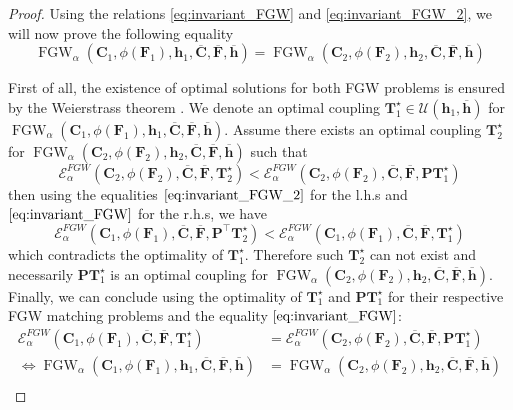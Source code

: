 \documentclass{article}
\def\vh{{\bm{h}}}
\def\mC{{\bm{C}}}
\def\mF{{\bm{F}}}
\def\mP{{\bm{P}}}
\def\mT{{\bm{T}}}
\newcommand{\FGW}{\operatorname{FGW}}
\begin{document}
{\begin{proof}
Using the relations \ref{eq:invariant_FGW} and \ref{eq:invariant_FGW_2}, we will now prove the following equality 
\begin{equation}
	\FGW_\alpha(\mC_1, \phi(\mF_1), \vh_1,  \overline{\mC}, \overline{\mF}, \overline{\vh}) = \FGW_\alpha(\mC_2, \phi(\mF_2), \vh_2,  \overline{\mC}, \overline{\mF}, \overline{\vh})
\end{equation}



First of all, the existence of optimal solutions for both FGW problems is ensured by the Weierstrass theorem \cite{santambrogio2015optimal}. We denote an optimal coupling $\mT^\star_1 \in \mathcal{U}(\vh_1, \overline{\vh})$ for $\FGW_\alpha(\mC_1, \phi(\mF_1), \vh_1,  \overline{\mC}, \overline{\mF}, \overline{\vh})$. Assume there exists an optimal coupling $\mT^\star_2$ for $\FGW_\alpha(\mC_2, \phi(\mF_2), \vh_2,  \overline{\mC}, \overline{\mF}, \overline{\vh})$ such that 
\begin{equation}
	\mathcal{E}^{FGW}_\alpha(\mC_2, \phi(\mF_2), \overline{\mC}, \overline{\mF}, \mT^\star_2) < 	\mathcal{E}^{FGW}_\alpha(\mC_2, \phi(\mF_2), \overline{\mC}, \overline{\mF}, \mP\mT^\star_1)
\end{equation}
then using the equalities $\ref{eq:invariant_FGW_2}$ for the l.h.s and $\ref{eq:invariant_FGW}$ for the r.h.s, we have
\begin{equation}
\mathcal{E}^{FGW}_\alpha(\mC_1, \phi(\mF_1), \overline{\mC}, \overline{\mF}, \mP^\top \mT^\star_2) < 	\mathcal{E}^{FGW}_\alpha(\mC_1, \phi(\mF_1), \overline{\mC}, \overline{\mF}, \mT^\star_1)
\end{equation}
which contradicts the optimality of $\mT^\star_1$. Therefore such $\mT^\star_2$ can not exist and necessarily $\mP \mT^\star_1$ is an optimal coupling for $\FGW_\alpha(\mC_2, \phi(\mF_2), \vh_2,  \overline{\mC}, \overline{\mF}, \overline{\vh})$. Finally, we can conclude using the optimality of $\mT^\star_1$ and $\mP \mT^\star_1$ for their respective FGW matching problems and the equality $\ref{eq:invariant_FGW}$:
\begin{equation}
	\begin{split}
		\mathcal{E}^{FGW}_\alpha(\mC_1, \phi(\mF_1), \overline{\mC}, \overline{\mF}, \mT^\star_1) &= \mathcal{E}^{FGW}_\alpha(\mC_2, \phi(\mF_2), \overline{\mC}, \overline{\mF}, \mP\mT^\star_1) \\
		\Leftrightarrow \FGW_\alpha(\mC_1, \phi(\mF_1), \vh_1, \overline{\mC}, \overline{\mF}, \overline{\vh}) &= \FGW_\alpha(\mC_2, \phi(\mF_2), \vh_2, \overline{\mC}, \overline{\mF}, \overline{\vh}) \\
	\end{split}
\end{equation}
\end{proof}

}
\end{document}
